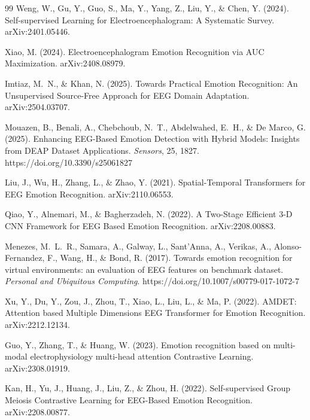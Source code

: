 \documentclass[11pt]{report}
\begin{document}
\begin{thebibliography}{99}
Weng, W., Gu, Y., Guo, S., Ma, Y., Yang, Z., Liu, Y., \& Chen, Y. (2024).
Self-supervised Learning for Electroencephalogram: A Systematic Survey.
arXiv:2401.05446.

Xiao, M. (2024). Electroencephalogram Emotion Recognition via AUC
Maximization. arXiv:2408.08979.

Imtiaz, M.~N., \& Khan, N. (2025). Towards Practical Emotion Recognition:
An Unsupervised Source-Free Approach for EEG Domain Adaptation.
arXiv:2504.03707.

Mouazen, B., Benali, A., Chebchoub, N.~T., Abdelwahed, E.~H., \& De Marco,
G. (2025). Enhancing EEG-Based Emotion Detection with Hybrid Models:
Insights from DEAP Dataset Applications. \emph{Sensors}, 25, 1827.
https://doi.org/10.3390/s25061827

Liu, J., Wu, H., Zhang, L., \& Zhao, Y. (2021). Spatial-Temporal
Transformers for EEG Emotion Recognition. arXiv:2110.06553.

Qiao, Y., Alnemari, M., \& Bagherzadeh, N. (2022). A Two-Stage Efficient
3-D CNN Framework for EEG Based Emotion Recognition. arXiv:2208.00883.

Menezes, M.~L.~R., Samara, A., Galway, L., Sant'Anna, A., Verikas, A.,
Alonso-Fernandez, F., Wang, H., \& Bond, R. (2017). Towards emotion
recognition for virtual environments: an evaluation of EEG features on
benchmark dataset. \emph{Personal and Ubiquitous Computing}.
https://doi.org/10.1007/s00779-017-1072-7

Xu, Y., Du, Y., Zou, J., Zhou, T., Xiao, L., Liu, L., \& Ma, P. (2022).
AMDET: Attention based Multiple Dimensions EEG Transformer for Emotion
Recognition. arXiv:2212.12134.

Guo, Y., Zhang, T., \& Huang, W. (2023). Emotion recognition based on
multi-modal electrophysiology multi-head attention Contrastive Learning.
arXiv:2308.01919.

Kan, H., Yu, J., Huang, J., Liu, Z., \& Zhou, H. (2022). Self-supervised
Group Meiosis Contrastive Learning for EEG-Based Emotion Recognition.
arXiv:2208.00877.


\end{thebibliography}
\end{document}
